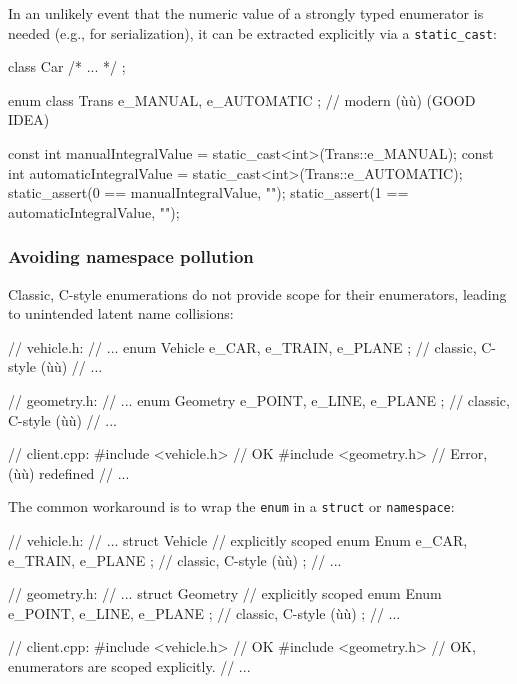 In an unlikely event that the numeric value of a strongly typed
enumerator is needed (e.g., for serialization), it can be extracted
explicitly via a \texttt{static\_cast}:

\begin{emcppshiddenlisting}[emcppsbatch=e6]
class Car { /* ... */ };

enum class Trans { e_MANUAL, e_AUTOMATIC };  // modern (ù{}ù) (GOOD IDEA)
\end{emcppshiddenlisting}
\begin{emcppslisting}[emcppsbatch=e6]
const int manualIntegralValue    = static_cast<int>(Trans::e_MANUAL);
const int automaticIntegralValue = static_cast<int>(Trans::e_AUTOMATIC);
static_assert(0 == manualIntegralValue,    "");
static_assert(1 == automaticIntegralValue, "");
\end{emcppslisting}

\subsubsection[Avoiding namespace pollution]{Avoiding namespace pollution}\label{avoiding-namespace-pollution}

Classic, C-style enumerations do not provide scope for their
enumerators, leading to unintended latent name collisions:

\begin{emcppslisting}
// vehicle.h:
// ...
enum Vehicle  { e_CAR, e_TRAIN, e_PLANE };  // classic, C-style (ù{}ù)
// ...

// geometry.h:
// ...
enum Geometry { e_POINT, e_LINE,  e_PLANE };  // classic, C-style (ù{}ù)
// ...

// client.cpp:
#include <vehicle.h>  // OK
#include <geometry.h> // Error, (ù{}ù) redefined
// ...
\end{emcppslisting}

\noindent The common workaround is to wrap the \texttt{enum} in a \texttt{struct}
or \texttt{namespace}:

\begin{emcppslisting}
// vehicle.h:
// ...
struct Vehicle {                            // explicitly scoped
    enum Enum { e_CAR, e_TRAIN, e_PLANE };  // classic, C-style (ù{}ù)
};
// ...

// geometry.h:
// ...
struct Geometry {                            // explicitly scoped
    enum Enum { e_POINT, e_LINE, e_PLANE };  // classic, C-style (ù{}ù)
};
// ...

// client.cpp:
#include <vehicle.h>    // OK
#include <geometry.h>   // OK, enumerators are scoped explicitly.
// ...
\end{emcppslisting}

